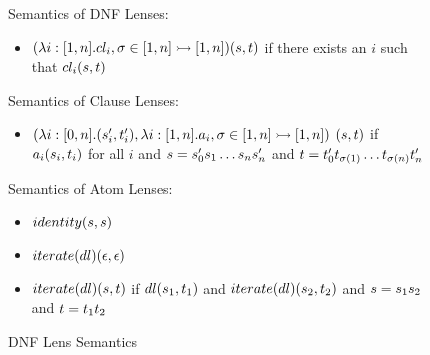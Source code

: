 \begin{figure}
Semantics of DNF Lenses:
\begin{itemize}
\item $(\lambda i:[1,n].cl_i, \sigma \in [1,n] \rightarrowtail [1,n])(s,t)$
if there exists an $i$ such that $cl_i(s,t)$
\end{itemize}

Semantics of Clause Lenses:
\begin{itemize}
\item $(\lambda i:[0,n].(s_i',t_i'),\lambda i:[1,n].a_i,\sigma \in [1,n] \rightarrowtail [1,n])$ $(s,t)$
if $a_i(s_i,t_i)$ for all $i$
and $s=s_0's_1\ldots s_ns_n'$
and $t=t_0't_{\sigma(1)}\ldots t_{\sigma(n)}t_n'$
\end{itemize}

Semantics of Atom Lenses:
\begin{itemize}
\item $identity(s,s)$
\item $iterate(dl)(\epsilon,\epsilon)$
\item $iterate(dl)(s,t)$
if $dl(s_1,t_1)$
and $iterate(dl)(s_2,t_2)$
and $s=s_1s_2$
and $t=t_1t_2$
\end{itemize}
\caption{DNF Lens Semantics}
\label{fig:dnf-lens-semantics}
\end{figure}
